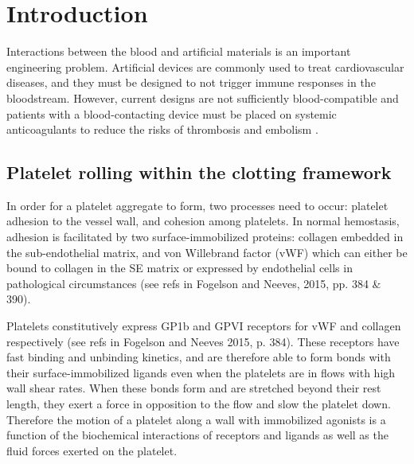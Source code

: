 
\chapter{Introduction}
\label{cha:introduction}


Interactions between the blood and artificial materials is an
important engineering problem. Artificial devices are commonly used to
treat cardiovascular diseases, and they must be designed to not
trigger immune responses in the bloodstream. However, current designs
are not sufficiently blood-compatible and patients with a
blood-contacting device must be placed on systemic anticoagulants to
reduce the risks of thrombosis and embolism
\cite{Ratner1993,Ratner2007,Oprea13}. 
	

\section{Platelet rolling within the clotting framework}
\label{sec:plat-roll-with}

In order for a platelet aggregate to form, two processes need to
occur: platelet adhesion to the vessel wall, and cohesion among
platelets. In normal hemostasis, adhesion is facilitated by two
surface-immobilized proteins: collagen embedded in the sub-endothelial
matrix, and von Willebrand factor (vWF) which can either be bound to
collagen in the SE matrix or expressed by endothelial cells in
pathological circumstances (see refs in Fogelson and Neeves, 2015,
pp. 384 \& 390).
		
Platelets constitutively express GP1b and GPVI receptors for vWF and
collagen respectively (see refs in Fogelson and Neeves 2015,
p. 384). These receptors have fast binding and unbinding kinetics, and
are therefore able to form bonds with their surface-immobilized
ligands even when the platelets are in flows with high wall shear
rates. When these bonds form and are stretched beyond their rest
length, they exert a force in opposition to the flow and slow the
platelet down. Therefore the motion of a platelet along a wall with
immobilized agonists is a function of the biochemical interactions of
receptors and ligands as well as the fluid forces exerted on the
platelet.
		
